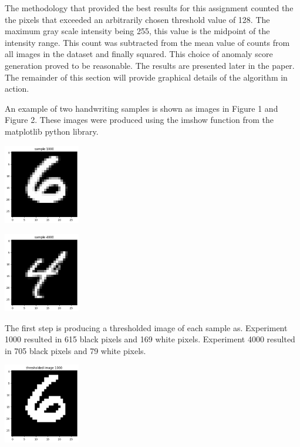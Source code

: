 The methodology that provided the best results for this assignment counted the the pixels that exceeded an arbitrarily chosen threshold value of 128. The maximum gray scale intensity being 255, this value is the midpoint of the intensity range. This count was subtracted from the mean value of counts from all images in the dataset and finally squared. This choice of anomaly score generation proved to be reasonable. The results are presented later in the paper. The remainder of this section will provide graphical details of the algorithm in action.

An example of two handwriting samples is shown as images in Figure 1 and Figure 2. These images were produced using the imshow function from the matplotlib python library.


\begin{center}
\includegraphics[width=0.25\textwidth]{./images/image1.png}
\label{fig:sample1}
\end{center}



\begin{center}
\includegraphics[width=0.25\textwidth]{./images/image2.png}
\label{fig:sample2}
\end{center}



The first step is producing a thresholded image of each sample as. Experiment 1000 resulted in 615 black pixels and 169 white pixels. Experiment 4000 resulted in 705 black pixels and 79 white pixels.
\begin{center}
\includegraphics[width=0.25\textwidth]{./images/image3.png}
\label{fig:sample3}
\end{center}


